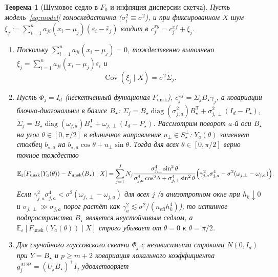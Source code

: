 \documentclass[11pt,a4paper]{article}
\numberwithin{equation}{section}
\newtheorem{theorem}{Теорема}[section]
\theoremstyle{definition}
\theoremstyle{remark}
\newcommand{\E}{\mathbb{E}}
\newcommand{\Cov}{\operatorname{Cov}}
\newcommand{\diag}{\operatorname{diag}}
\newcommand{\T}{^{\mathsf T}}
\begin{document}
\begin{theorem}[Шумовое седло в $F_0$ и инфляция дисперсии скетча]
\label{thm:noise-saddle}
Пусть модель~\eqref{eq:model} гомоскедастична ($\sigma_i^2 \equiv \sigma^2$),
и при фиксированном $X$ шум $\xi_j := \sum_{i=1}^n a_{ji}(x_i - \mu_j)(\varepsilon_i - \bar\varepsilon_j)$
входит в $c_j^{xy} = c_j^{xf} + \xi_j$.
\begin{enumerate}[label=(\alph*)]
  \item Поскольку $\sum_{i=1}^n a_{ji}(x_i - \mu_j) = 0$, тождественно выполнено
  $\xi_j = \sum_{i=1}^n a_{ji}(x_i - \mu_j)\varepsilon_i$ и
  \begin{equation}\label{eq:xi-cov}
    \Cov(\xi_j \mid X) = \sigma^2 \widetilde{\Sigma}_j.
  \end{equation}
  \item Пусть $\Phi_j = I_d$ (нескетченный функционал $F_{\mathrm{unsk}}$),
  $c_j^{xf} = \Sigma_j B_\star \gamma_j$, а ковариации блочно-диагональны в базисе $B_\star$:
  $\Sigma_j = B_\star \diag(\sigma_{j,a}^2) B_\star\T + \sigma_{j,\perp}^2 (I_d - P_\star)$,
  $\widetilde{\Sigma}_j = B_\star \diag(\omega_{j,a}) B_\star\T + \omega_{j,\perp} (I_d - P_\star)$.
  Рассмотрим поворот $a$-й оси $B_\star$ на угол $\theta \in [0, \pi/2]$ в единичное
  направление $u_\perp \in S_\star^\perp$:
  $Y_a(\theta)$ заменяет столбец $b_{\star,a}$ на $b_{\star,a}\cos\theta + u_\perp \sin\theta$.
  Тогда для всех $\theta \in [0, \pi/2]$ верно точное тождество
  \begin{equation}\label{eq:saddle-identity}
    \E_\varepsilon\!\left[F_{\mathrm{unsk}}(Y_a(\theta)) - F_{\mathrm{unsk}}(B_\star) \mid X\right]
    = \sum_{j=1}^J N_j \frac{\sigma_{j,\perp}^4 \sin^2\theta}{\sigma_{j,a}^4 \cos^2\theta + \sigma_{j,\perp}^4 \sin^2\theta}
      \Bigl(\gamma_{j,a}^2 \sigma_{j,a}^4 - \sigma^2(\omega_{j,\perp} - \omega_{j,a})\Bigr).
  \end{equation}
  Если $\gamma_{j,a}^2 \sigma_{j,a}^4 < \sigma^2(\omega_{j,\perp} - \omega_{j,a})$
  для всех $j$ (в анизотропном окне при $h_k \downarrow 0$ и $\sigma_{j,\perp} \gg \sigma_{j,a}$
  порог растёт как $\gamma_a^2 \lesssim \sigma^2 / (n_{\mathrm{eff}} h_k^4)$),
  то истинное подпространство $B_\star$ является неустойчивым седлом,
  а $\E_\varepsilon[F_{\mathrm{unsk}}(Y_a(\theta)) \mid X]$ строго убывает от $\theta = 0$ к $\theta = \pi/2$.
  \item Для случайного гауссовского скетча $\Phi_j$ с независимыми строками
  $N(0, I_d)$ при $Y = B_\star$ и $p \ge m + 2$ ковариация локального коэффициента
  $g_j^{\mathrm{ADP}} = (U_j B_\star)^+ I_j$ удовлетворяет

\end{enumerate}
\end{theorem}
\end{document}
